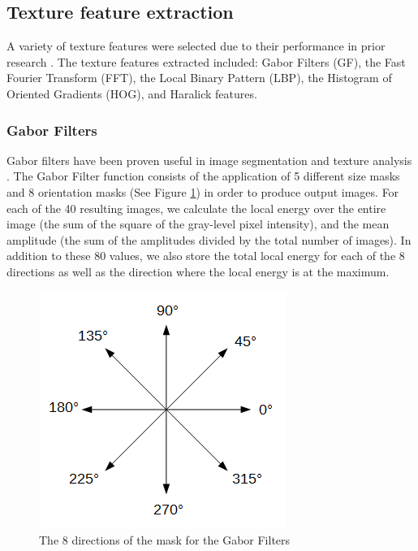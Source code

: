 \documentclass[runningheads,a4paper]{llncs}
\begin{document}
  
  
  
  
  
  
  
  
  
  
  
  
  
  
  
  
  
  

\subsection{Texture feature extraction}

A variety of texture features were selected due to their performance in prior research \cite{RodriguezDamian_2006,Redondo_2015,Maillard_2003,Marcos_2015}.
The texture features extracted included: Gabor Filters (GF), the Fast Fourier Transform (FFT), the Local Binary Pattern (LBP), the Histogram of Oriented Gradients (HOG), and Haralick features.

\subsubsection{Gabor Filters}

Gabor filters have been proven useful in image segmentation and texture analysis \cite{Zheng_2004}. The Gabor Filter function consists of the application of 5 different size masks and 8 orientation masks (See Figure \ref{fig:gabor}) in order to produce output images. For each of the 40 resulting images, we calculate the local energy over the entire image (the sum of the square of the gray-level pixel intensity), and the mean amplitude (the sum of the amplitudes divided by the total number of images). In addition to these 80 values, we also store the total local energy for each of the 8 directions as well as the direction where the local energy is at the maximum.

  
  
  
  
  
  
  
  
  
  
  
  

\begin{figure}[h!]
\begin{center}
\includegraphics[width=0.42\columnwidth]{figures/direction1/direction1.PNG}
\caption{\label{fig:gabor}
The 8 directions of the mask for the Gabor Filters
}
\end{center}
\end{figure}
\end{document}
